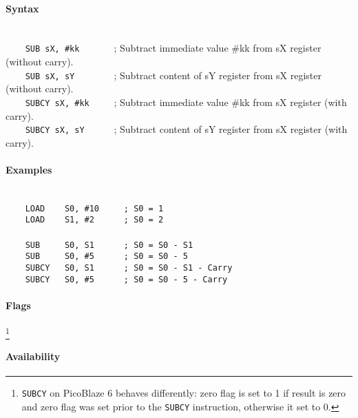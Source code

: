         \paragraph{Syntax}
            ~\\
            \verb'    SUB sX, #kk       '; Subtract immediate value \#kk from sX register (without carry).\\
            \verb'    SUB sX, sY        '; Subtract content of sY register from sX register (without carry).\\
            \verb'    SUBCY sX, #kk     '; Subtract immediate value \#kk from sX register (with carry).\\
            \verb'    SUBCY sX, sY      '; Subtract content of sY register from sX register (with carry).

        \paragraph{Examples}
            ~\\
            \verb'    LOAD    S0, #10     ; S0 = 1'\\
            \verb'    LOAD    S1, #2      ; S0 = 2'\\
            \verb''\\
            \verb'    SUB     S0, S1      ; S0 = S0 - S1'\\
            \verb'    SUB     S0, #5      ; S0 = S0 - 5'\\
            \verb'    SUBCY   S0, S1      ; S0 = S0 - S1 - Carry'\\
            \verb'    SUBCY   S0, #5      ; S0 = S0 - 5 - Carry'

        \paragraph{Flags}
            \footnote{\texttt{SUBCY} on PicoBlaze 6 behaves differently: zero flag is set to 1 if result is zero and zero flag was set prior to the \texttt{SUBCY} instruction, otherwise it set to 0.}

        \paragraph{Availability}
            \pbavailability{\yes}{\yes}{\yes}{\yes}{\yes}

\clearpage
